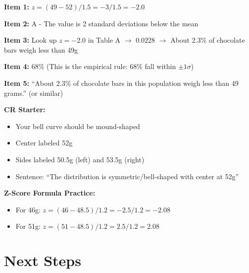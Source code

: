 \documentclass[11pt]{article}
\begin{document}
\begin{tcolorbox}[colback=green!5!white,colframe=green!75!black,title=\textbf{Solutions}]

\textbf{Item 1:} $z = (49 - 52) / 1.5 = -3 / 1.5 = -2.0$

\vspace{0.1in}

\textbf{Item 2:} A - The value is 2 standard deviations below the mean

\vspace{0.1in}

\textbf{Item 3:} Look up $z = -2.0$ in Table A $\rightarrow$ 0.0228 $\rightarrow$ About 2.3\% of chocolate bars weigh less than 49g

\vspace{0.1in}

\textbf{Item 4:} 68\% (This is the empirical rule: 68\% fall within $\pm 1\sigma$)

\vspace{0.1in}

\textbf{Item 5:} ``About 2.3\% of chocolate bars in this population weigh less than 49 grams.'' (or similar)

\vspace{0.1in}

\textbf{CR Starter:}
\begin{itemize}
    \item Your bell curve should be mound-shaped
    \item Center labeled 52g
    \item Sides labeled 50.5g (left) and 53.5g (right)
    \item Sentence: ``The distribution is symmetric/bell-shaped with center at 52g''
\end{itemize}

\vspace{0.1in}

\textbf{Z-Score Formula Practice:}
\begin{itemize}
    \item For 46g: $z = (46 - 48.5) / 1.2 = -2.5 / 1.2 = -2.08$
    \item For 51g: $z = (51 - 48.5) / 1.2 = 2.5 / 1.2 = 2.08$
\end{itemize}

\end{tcolorbox}

\vspace{0.2in}

\section*{Next Steps}
\end{document}
